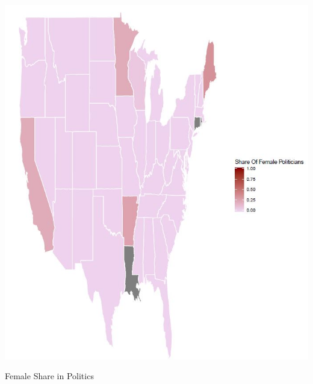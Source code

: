 \documentclass{article}
\begin{document}
\includegraphics[width=\textwidth]{PS6c_Tayebi.png}
\begin{center}

Female Share in Politics
\end{center}
\end{document}
